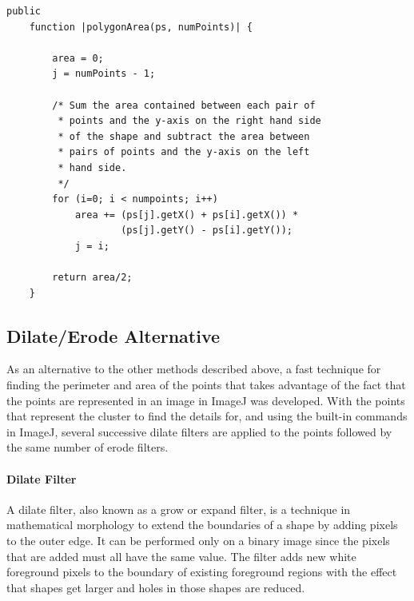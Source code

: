 \begin{center}
\begin{minipage}{\textwidth}
	\begin{lstlisting}[caption={[Code to find the area of an irregular
	polygon.]Code to find the area of an irregular polygon.  Adapted
	from~\cite{finley2006poly}}, label=lst:polygon-area] public
	function |polygonArea(ps, numPoints)| {

		area = 0;
		j = numPoints - 1;

		/* Sum the area contained between each pair of
		 * points and the y-axis on the right hand side
		 * of the shape and subtract the area between
		 * pairs of points and the y-axis on the left
		 * hand side.
		 */
		for (i=0; i < numpoints; i++)
			area += (ps[j].getX() + ps[i].getX()) *
		            (ps[j].getY() - ps[i].getY());
			j = i;

		return area/2;
	}
\end{lstlisting}
\end{minipage}
\end{center}

\subsection{Dilate/Erode Alternative}
\label{ssub:Dilate/Erode Alternative}

As an alternative to the other methods described above, a fast technique for
finding the perimeter and area of the points that takes advantage of the fact
that the points are represented in an image in ImageJ was developed. With the
points that represent the cluster to find the details for, and using the
built-in commands in ImageJ, several successive dilate filters are applied to
the points followed by the same number of erode filters.

\paragraph{Dilate Filter}
\label{par:dilate_filter}

A dilate filter, also known as a grow or expand filter, is a technique in
mathematical morphology to extend the boundaries of a shape by adding pixels to
the outer edge. It can be performed only on a binary image since the pixels
that are added must all have the same value. The filter adds new white
foreground pixels to the boundary of existing foreground regions with the
effect that shapes get larger and holes in those shapes are reduced.

